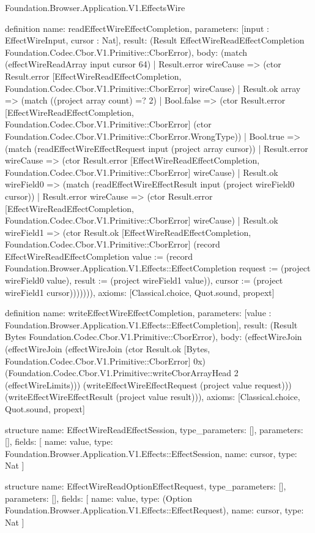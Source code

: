 \begin{lexlean}{Foundation.Browser.Application.V1.EffectsWire}
\begin{semanticmodule}
definition{
  name: readEffectWireEffectCompletion,
  parameters: [input : EffectWireInput, cursor : Nat],
  result: (Result EffectWireReadEffectCompletion Foundation.Codec.Cbor.V1.Primitive::CborError),
  body: (match (effectWireReadArray input cursor 64)
    | Result.error wireCause => (ctor Result.error [EffectWireReadEffectCompletion, Foundation.Codec.Cbor.V1.Primitive::CborError] wireCause)
    | Result.ok array => (match ((project array count) =? 2)
      | Bool.false => (ctor Result.error [EffectWireReadEffectCompletion, Foundation.Codec.Cbor.V1.Primitive::CborError] (ctor Foundation.Codec.Cbor.V1.Primitive::CborError.WrongType))
      | Bool.true => (match (readEffectWireEffectRequest input (project array cursor))
        | Result.error wireCause => (ctor Result.error [EffectWireReadEffectCompletion, Foundation.Codec.Cbor.V1.Primitive::CborError] wireCause)
        | Result.ok wireField0 => (match (readEffectWireEffectResult input (project wireField0 cursor))
          | Result.error wireCause => (ctor Result.error [EffectWireReadEffectCompletion, Foundation.Codec.Cbor.V1.Primitive::CborError] wireCause)
          | Result.ok wireField1 => (ctor Result.ok [EffectWireReadEffectCompletion, Foundation.Codec.Cbor.V1.Primitive::CborError] (record EffectWireReadEffectCompletion {value := (record Foundation.Browser.Application.V1.Effects::EffectCompletion {request := (project wireField0 value), result := (project wireField1 value)}), cursor := (project wireField1 cursor)})))))),
  axioms: [Classical.choice, Quot.sound, propext]
}

definition{
  name: writeEffectWireEffectCompletion,
  parameters: [value : Foundation.Browser.Application.V1.Effects::EffectCompletion],
  result: (Result Bytes Foundation.Codec.Cbor.V1.Primitive::CborError),
  body: (effectWireJoin (effectWireJoin (effectWireJoin (ctor Result.ok [Bytes, Foundation.Codec.Cbor.V1.Primitive::CborError] 0x) (Foundation.Codec.Cbor.V1.Primitive::writeCborArrayHead 2 (effectWireLimits))) (writeEffectWireEffectRequest (project value request))) (writeEffectWireEffectResult (project value result))),
  axioms: [Classical.choice, Quot.sound, propext]
}

structure{
  name: EffectWireReadEffectSession,
  type_parameters: [],
  parameters: [],
  fields: [
    {name: value, type: Foundation.Browser.Application.V1.Effects::EffectSession},
    {name: cursor, type: Nat}
  ]
}

structure{
  name: EffectWireReadOptionEffectRequest,
  type_parameters: [],
  parameters: [],
  fields: [
    {name: value, type: (Option Foundation.Browser.Application.V1.Effects::EffectRequest)},
    {name: cursor, type: Nat}
  ]
}


\end{semanticmodule}
\end{lexlean}
